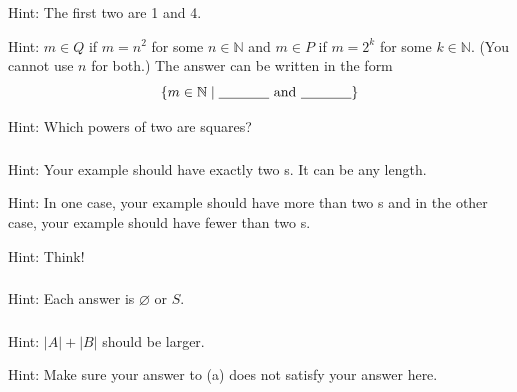 \subsubsection*{ \answers}
\begin{apart}
    \item Hint: The first two are 1 and 4.
    \item Hint: $m \in Q$ if $m = n^2$ for some $n \in \mathbb{N}$ and $m \in P$ if $m = 2^k$ for some $k \in \mathbb{N}$. (You cannot use $n$ for both.)  The answer can be written in the form
    $$\{m \in \mathbb{N} \mid \text{\underline{\hspace{.5in}}  and \underline{\hspace{.5in}}} \}$$
    \item Hint: Which powers of two are squares?
\end{apart}

\subsubsection*{ \answers}
\begin{apart}
    \item Hint: Your example should have exactly two s. It can be any length.
    \item Hint: In one case, your example should have more than two s and in the other case, your example should have fewer than two s.
    \item Hint: Think!
\end{apart}

\subsubsection*{ \answers}
Hint: Each answer is $\varnothing$ or $S$.

\subsubsection*{ \answers}
\begin{apart}
    \item Hint: $|A|+|B|$ should be larger.
    \item Hint: Make sure your answer to (a) does not satisfy your answer here.
\end{apart}




